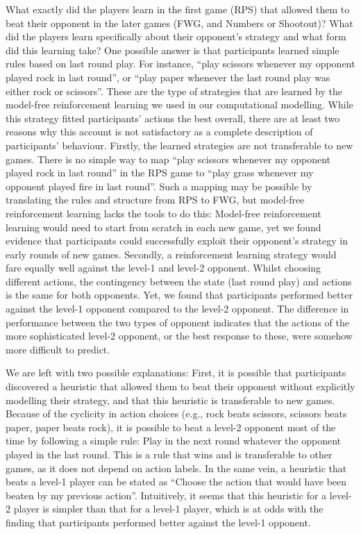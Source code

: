 \documentclass[smallextended]{svjour3}       %
\begin{document}
What exactly did the players learn in the first game (RPS) that allowed
them to beat their opponent in the later games (FWG, and Numbers or
Shootout)? What did the players learn specifically about their
opponent's strategy and what form did this learning take? One possible
answer is that participants learned simple rules based on last round
play. For instance, ``play scissors whenever my opponent played rock in
last round'', or ``play paper whenever the last round play was either
rock or scissors''. These are the type of strategies that are learned by
the model-free reinforcement learning we used in our computational
modelling. While this strategy fitted participants' actions the best
overall, there are at least two reasons why this account is not
satisfactory as a complete description of participants' behaviour.
Firstly, the learned strategies are not transferable to new games. There
is no simple way to map ``play scissors whenever my opponent played rock
in last round'' in the RPS game to ``play grass whenever my opponent
played fire in last round''. Such a mapping may be possible by
translating the rules and structure from RPS to FWG, but model-free
reinforcement learning lacks the tools to do this: Model-free
reinforcement learning would need to start from scratch in each new
game, yet we found evidence that participants could successfully exploit
their opponent's strategy in early rounds of new games. Secondly, a
reinforcement learning strategy would fare equally well against the
level-1 and level-2 opponent. Whilst choosing different actions, the
contingency between the state (last round play) and actions is the same
for both opponents. Yet, we found that participants performed better
against the level-1 opponent compared to the level-2 opponent. The
difference in performance between the two types of opponent indicates
that the actions of the more sophisticated level-2 opponent, or the best
response to these, were somehow more difficult to predict.

We are left with two possible explanations: First, it is possible that
participants discovered a heuristic that allowed them to beat their
opponent without explicitly modelling their strategy, and that this
heuristic is transferable to new games. Because of the cyclicity in
action choices (e.g., rock beats scissors, scissors beats paper, paper
beats rock), it is possible to beat a level-2 opponent most of the time
by following a simple rule: Play in the next round whatever the opponent
played in the last round. This is a rule that wins and is transferable
to other games, as it does not depend on action labels. In the same
vein, a heuristic that beats a level-1 player can be stated as ``Choose
the action that would have been beaten by my previous action''.
Intuitively, it seems that this heuristic for a level-2 player is
simpler than that for a level-1 player, which is at odds with the
finding that participants performed better against the level-1 opponent.
\end{document}
